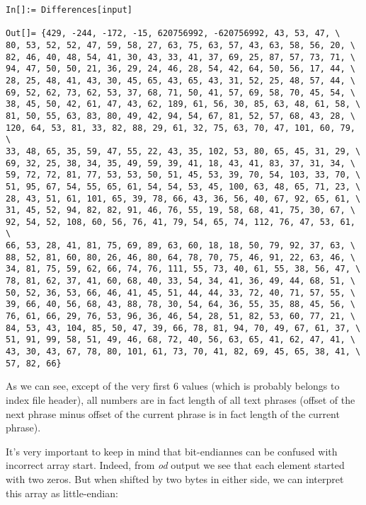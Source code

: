 \begin{lstlisting}[style=custommath]
In[]:= Differences[input]

Out[]= {429, -244, -172, -15, 620756992, -620756992, 43, 53, 47, \
80, 53, 52, 52, 47, 59, 58, 27, 63, 75, 63, 57, 43, 63, 58, 56, 20, \
82, 46, 40, 48, 54, 41, 30, 43, 33, 41, 37, 69, 25, 87, 57, 73, 71, \
94, 47, 50, 50, 21, 36, 29, 24, 46, 28, 54, 42, 64, 50, 56, 17, 44, \
28, 25, 48, 41, 43, 30, 45, 65, 43, 65, 43, 31, 52, 25, 48, 57, 44, \
69, 52, 62, 73, 62, 53, 37, 68, 71, 50, 41, 57, 69, 58, 70, 45, 54, \
38, 45, 50, 42, 61, 47, 43, 62, 189, 61, 56, 30, 85, 63, 48, 61, 58, \
81, 50, 55, 63, 83, 80, 49, 42, 94, 54, 67, 81, 52, 57, 68, 43, 28, \
120, 64, 53, 81, 33, 82, 88, 29, 61, 32, 75, 63, 70, 47, 101, 60, 79, \
33, 48, 65, 35, 59, 47, 55, 22, 43, 35, 102, 53, 80, 65, 45, 31, 29, \
69, 32, 25, 38, 34, 35, 49, 59, 39, 41, 18, 43, 41, 83, 37, 31, 34, \
59, 72, 72, 81, 77, 53, 53, 50, 51, 45, 53, 39, 70, 54, 103, 33, 70, \
51, 95, 67, 54, 55, 65, 61, 54, 54, 53, 45, 100, 63, 48, 65, 71, 23, \
28, 43, 51, 61, 101, 65, 39, 78, 66, 43, 36, 56, 40, 67, 92, 65, 61, \
31, 45, 52, 94, 82, 82, 91, 46, 76, 55, 19, 58, 68, 41, 75, 30, 67, \
92, 54, 52, 108, 60, 56, 76, 41, 79, 54, 65, 74, 112, 76, 47, 53, 61, \
66, 53, 28, 41, 81, 75, 69, 89, 63, 60, 18, 18, 50, 79, 92, 37, 63, \
88, 52, 81, 60, 80, 26, 46, 80, 64, 78, 70, 75, 46, 91, 22, 63, 46, \
34, 81, 75, 59, 62, 66, 74, 76, 111, 55, 73, 40, 61, 55, 38, 56, 47, \
78, 81, 62, 37, 41, 60, 68, 40, 33, 54, 34, 41, 36, 49, 44, 68, 51, \
50, 52, 36, 53, 66, 46, 41, 45, 51, 44, 44, 33, 72, 40, 71, 57, 55, \
39, 66, 40, 56, 68, 43, 88, 78, 30, 54, 64, 36, 55, 35, 88, 45, 56, \
76, 61, 66, 29, 76, 53, 96, 36, 46, 54, 28, 51, 82, 53, 60, 77, 21, \
84, 53, 43, 104, 85, 50, 47, 39, 66, 78, 81, 94, 70, 49, 67, 61, 37, \
51, 91, 99, 58, 51, 49, 46, 68, 72, 40, 56, 63, 65, 41, 62, 47, 41, \
43, 30, 43, 67, 78, 80, 101, 61, 73, 70, 41, 82, 69, 45, 65, 38, 41, \
57, 82, 66}
\end{lstlisting}

As we can see, except of the very first 6 values (which is probably belongs to index file header), all numbers are in fact length of all text phrases (offset of the next phrase minus offset of the current phrase is in fact length of the current phrase).

It's very important to keep in mind that bit-endiannes can be confused with incorrect array start.
Indeed, from \emph{od} output we see that each element started with two zeros.
But when shifted by two bytes in either side, we can interpret this array as little-endian:

